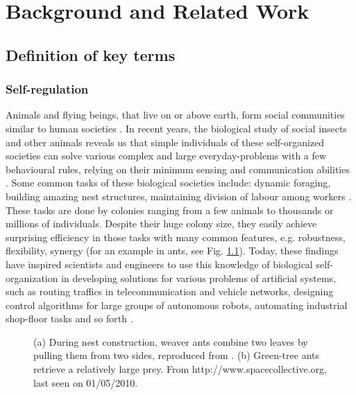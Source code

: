 \chapter{Background and Related Work}
\label{bg}
\section{Definition of key terms}
\subsection{Self-regulation}
\label{bg:def:self-reg}
Animals and flying beings, that live on or above earth, form social communities similar to human societies \cite{SIHQ1995}. In recent years, the biological study of social insects and other animals reveals 
us that simple individuals of these self-organized  societies can solve various complex and large everyday-problems with a few behavioural rules, relying on their minimum sensing and communication abilities \cite{Camazine+2001}. Some common tasks of these biological societies include: dynamic foraging, building amazing nest structures, maintaining division of labour among workers \cite{Bonabeau+1999}. These tasks are done by colonies  ranging from a few animals to thousands or millions of individuals. Despite their huge colony size, they easily achieve surprising efficiency in those tasks with many common features, e.g. robustness, flexibility, synergy (for an example in ants, see Fig. \ref{fig:self-org-ants}). Today, these findings have inspired scientists and engineers to use this knowledge of biological self-organization in developing solutions for various problems of artificial systems, such as  routing traffics in telecommunication and vehicle networks, designing control algorithms for large groups of autonomous robots, automating industrial shop-floor tasks and so forth \cite{Garnier+2007}.\\
\begin{figure}[htp]
  \centering
  \hspace{0.25cm}
  \caption{(a) During nest construction, weaver ants combine two leaves by pulling them from two sides, reproduced from \protect{}.
(b) Green-tree ants retrieve a relatively large prey. From http://www.spacecollective.org, last seen on 01/05/2010. }
  \label{fig:self-org-ants}
\end{figure}
